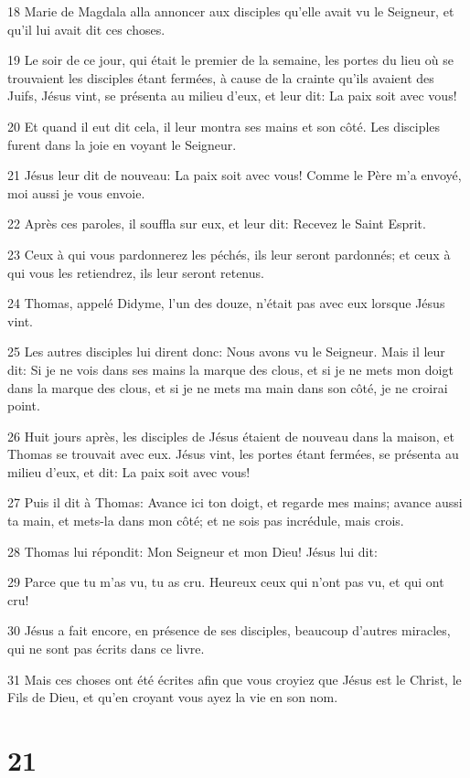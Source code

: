 \par 18 Marie de Magdala alla annoncer aux disciples qu'elle avait vu le Seigneur, et qu'il lui avait dit ces choses.
\par 19 Le soir de ce jour, qui était le premier de la semaine, les portes du lieu où se trouvaient les disciples étant fermées, à cause de la crainte qu'ils avaient des Juifs, Jésus vint, se présenta au milieu d'eux, et leur dit: La paix soit avec vous!
\par 20 Et quand il eut dit cela, il leur montra ses mains et son côté. Les disciples furent dans la joie en voyant le Seigneur.
\par 21 Jésus leur dit de nouveau: La paix soit avec vous! Comme le Père m'a envoyé, moi aussi je vous envoie.
\par 22 Après ces paroles, il souffla sur eux, et leur dit: Recevez le Saint Esprit.
\par 23 Ceux à qui vous pardonnerez les péchés, ils leur seront pardonnés; et ceux à qui vous les retiendrez, ils leur seront retenus.
\par 24 Thomas, appelé Didyme, l'un des douze, n'était pas avec eux lorsque Jésus vint.
\par 25 Les autres disciples lui dirent donc: Nous avons vu le Seigneur. Mais il leur dit: Si je ne vois dans ses mains la marque des clous, et si je ne mets mon doigt dans la marque des clous, et si je ne mets ma main dans son côté, je ne croirai point.
\par 26 Huit jours après, les disciples de Jésus étaient de nouveau dans la maison, et Thomas se trouvait avec eux. Jésus vint, les portes étant fermées, se présenta au milieu d'eux, et dit: La paix soit avec vous!
\par 27 Puis il dit à Thomas: Avance ici ton doigt, et regarde mes mains; avance aussi ta main, et mets-la dans mon côté; et ne sois pas incrédule, mais crois.
\par 28 Thomas lui répondit: Mon Seigneur et mon Dieu! Jésus lui dit:
\par 29 Parce que tu m'as vu, tu as cru. Heureux ceux qui n'ont pas vu, et qui ont cru!
\par 30 Jésus a fait encore, en présence de ses disciples, beaucoup d'autres miracles, qui ne sont pas écrits dans ce livre.
\par 31 Mais ces choses ont été écrites afin que vous croyiez que Jésus est le Christ, le Fils de Dieu, et qu'en croyant vous ayez la vie en son nom.

\chapter{21}

